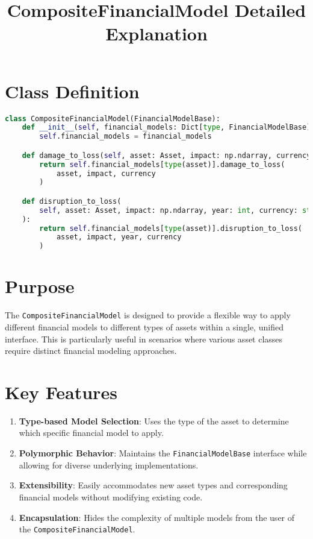 \documentclass{article}
\title{CompositeFinancialModel Detailed Explanation}
\author{}
\date{}
\begin{document}
\maketitle

\section{Class Definition}

\begin{lstlisting}[language=Python]
class CompositeFinancialModel(FinancialModelBase):
    def __init__(self, financial_models: Dict[type, FinancialModelBase]):
        self.financial_models = financial_models

    def damage_to_loss(self, asset: Asset, impact: np.ndarray, currency: str):
        return self.financial_models[type(asset)].damage_to_loss(
            asset, impact, currency
        )

    def disruption_to_loss(
        self, asset: Asset, impact: np.ndarray, year: int, currency: str
    ):
        return self.financial_models[type(asset)].disruption_to_loss(
            asset, impact, year, currency
        )
\end{lstlisting}

\section{Purpose}

The \texttt{CompositeFinancialModel} is designed to provide a flexible way to apply different financial models to different types of assets within a single, unified interface. This is particularly useful in scenarios where various asset classes require distinct financial modeling approaches.

\section{Key Features}

\begin{enumerate}
    \item \textbf{Type-based Model Selection}: Uses the type of the asset to determine which specific financial model to apply.

    \item \textbf{Polymorphic Behavior}: Maintains the \texttt{FinancialModelBase} interface while allowing for diverse underlying implementations.

    \item \textbf{Extensibility}: Easily accommodates new asset types and corresponding financial models without modifying existing code.

    \item \textbf{Encapsulation}: Hides the complexity of multiple models from the user of the \texttt{CompositeFinancialModel}.
\end{enumerate}
\end{document}
